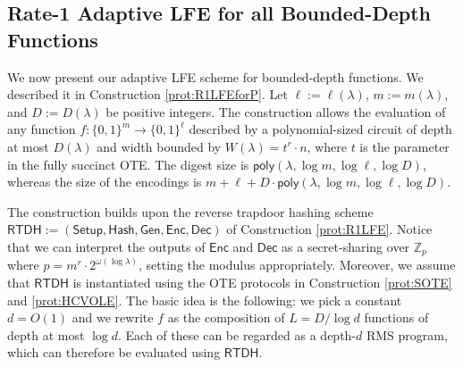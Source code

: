 \documentclass{theoretics}
\newcommand{\Z}{\mathbb{Z}}
\newcommand{\poly}{\mathsf{poly}}
\renewcommand{\sec}{\ensuremath{\lambda}}
\newcommand{\RTDH}{\mathsf{RTDH}}
\newcommand{\algofont}[1]{\ensuremath{\mathsf{#1}}}
\newcommand{\Enc}{{\algofont{Enc}}}
\newcommand{\Dec}{{\algofont{Dec}}}
\newcommand{\Setup}{{\algofont{Setup}}}
\newcommand{\Gen}{{\algofont{Gen}}}
\newcommand{\Hash}{{\algofont{Hash}}}
\begin{document}
\subsection{Rate-1 Adaptive LFE for all Bounded-Depth Functions}\label{sec:mainLFE}

We now present our adaptive LFE scheme for bounded-depth functions. We described it in Construction \ref{prot:R1LFEforP}. Let $\ell:=\ell(\sec)$, $m:=m(\sec)$,  and $D:=D(\sec)$ be positive integers. The construction allows the evaluation of any function $f:\{0, 1\}^m\rightarrow \{0, 1\}^\ell$ described by a polynomial-sized circuit of depth at most $D(\sec)$ and width bounded by $W(\sec)=t^r\cdot n$, where $t$ is the parameter in the fully succinct OTE. The digest size is $\poly(\sec, \log m, \log \ell, \log D)$, whereas the size of the encodings is $m+\ell+D\cdot \poly(\sec, \log m, \log \ell, \log D)$.


The construction builds upon the reverse trapdoor hashing scheme $\RTDH:=(\Setup, \allowbreak\Hash, \allowbreak\Gen, \Enc, \Dec)$ of Construction \ref{prot:R1LFE}. {Notice that we can interpret the outputs of $\Enc$ and $\Dec$ as a secret-sharing over $\Z_p$ where $p=m^r\cdot 2^{\omega(\log \sec)}$, setting the modulus appropriately.} Moreover, we assume that $\RTDH$ is instantiated using the OTE protocols in Construction \ref{prot:SOTE} and \ref{prot:HCVOLE}. The  basic idea is the following: we pick a constant $d=O(1)$ and we rewrite $f$ as the composition of $L=D/\log d$ functions of depth at most $\log d$. Each of these can be regarded as a depth-$d$ RMS program, which can therefore be evaluated using $\RTDH$.
\end{document}
